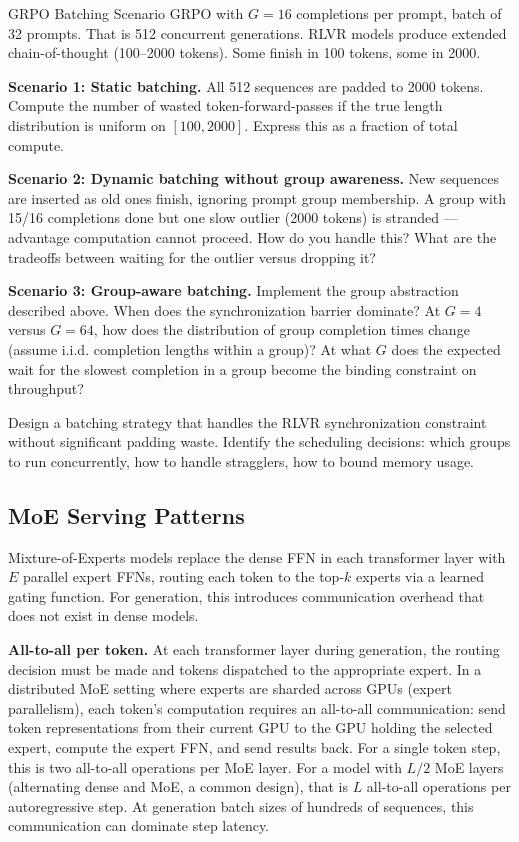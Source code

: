 \begin{thinkfirst}{GRPO Batching Scenario}
GRPO with $G = 16$ completions per prompt, batch of 32 prompts. That is 512 concurrent generations. RLVR models produce extended chain-of-thought (100--2000 tokens). Some finish in 100 tokens, some in 2000.

\textbf{Scenario 1: Static batching.} All 512 sequences are padded to 2000 tokens. Compute the number of wasted token-forward-passes if the true length distribution is uniform on $[100, 2000]$. Express this as a fraction of total compute.

\textbf{Scenario 2: Dynamic batching without group awareness.} New sequences are inserted as old ones finish, ignoring prompt group membership. A group with 15/16 completions done but one slow outlier (2000 tokens) is stranded --- advantage computation cannot proceed. How do you handle this? What are the tradeoffs between waiting for the outlier versus dropping it?

\textbf{Scenario 3: Group-aware batching.} Implement the group abstraction described above. When does the synchronization barrier dominate? At $G = 4$ versus $G = 64$, how does the distribution of group completion times change (assume i.i.d. completion lengths within a group)? At what $G$ does the expected wait for the slowest completion in a group become the binding constraint on throughput?

Design a batching strategy that handles the RLVR synchronization constraint without significant padding waste. Identify the scheduling decisions: which groups to run concurrently, how to handle stragglers, how to bound memory usage.
\end{thinkfirst}

\subsection{MoE Serving Patterns}

Mixture-of-Experts models replace the dense FFN in each transformer layer with $E$ parallel expert FFNs, routing each token to the top-$k$ experts via a learned gating function. For generation, this introduces communication overhead that does not exist in dense models.

\textbf{All-to-all per token.} At each transformer layer during generation, the routing decision must be made and tokens dispatched to the appropriate expert. In a distributed MoE setting where experts are sharded across GPUs (expert parallelism), each token's computation requires an all-to-all communication: send token representations from their current GPU to the GPU holding the selected expert, compute the expert FFN, and send results back. For a single token step, this is two all-to-all operations per MoE layer. For a model with $L/2$ MoE layers (alternating dense and MoE, a common design), that is $L$ all-to-all operations per autoregressive step. At generation batch sizes of hundreds of sequences, this communication can dominate step latency.

